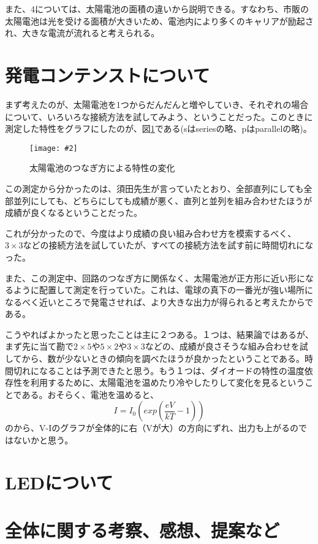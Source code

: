 \documentclass[11pt]{ltjsarticle}
\newcommand{\fg}[3]{
	\begin{figure}
		\texttt{[image: \#2]}
		\caption{#3}
		\label{#1}
	\end{figure}
}
\newcommand{\fr}[1]{図\ref{#1}}
\begin{document}
		また、4については、太陽電池の面積の違いから説明できる。すなわち、市販の太陽電池は光を受ける面積が大きいため、電池内により多くのキャリアが励起され、大きな電流が流れると考えられる。

\section{発電コンテンストについて}
	まず考えたのが、太陽電池を1つからだんだんと増やしていき、それぞれの場合について、いろいろな接続方法を試してみよう、ということだった。このときに測定した特性をグラフにしたのが、\fr{fig13}である(sはseriesの略、pはparallelの略)。
	\fg{fig13}{resources/solar/suda.png}{太陽電池のつなぎ方による特性の変化}
	この測定から分かったのは、須田先生が言っていたとおり、全部直列にしても全部並列にしても、どちらにしても成績が悪く、直列と並列を組み合わせたほうが成績が良くなるということだった。
	
	これが分かったので、今度はより成績の良い組み合わせ方を模索するべく、$3 \times 3$などの接続方法を試していたが、すべての接続方法を試す前に時間切れになった。
	
	また、この測定中、回路のつなぎ方に関係なく、太陽電池が正方形に近い形になるように配置して測定を行っていた。これは、電球の真下の一番光が強い場所になるべく近いところで発電させれば、より大きな出力が得られると考えたからである。

	こうやればよかったと思ったことは主に２つある。１つは、結果論ではあるが、まず先に当て勘で$2\times5$や$5\times2$や$3\times3$などの、成績が良さそうな組み合わせを試してから、数が少ないときの傾向を調べたほうが良かったということである。時間切れになることは予測できたと思う。もう１つは、ダイオードの特性の温度依存性を利用するために、太陽電池を温めたり冷やしたりして変化を見るということである。おそらく、電池を温めると、
	\[
		I = I_0 \left( exp(\frac{eV}{kT}-1) \right)
	\]
のから、V-Iのグラフが全体的に右（Vが大）の方向にずれ、出力も上がるのではないかと思う。

\section{LEDについて}
\section{全体に関する考察、感想、提案など}
\end{document}
